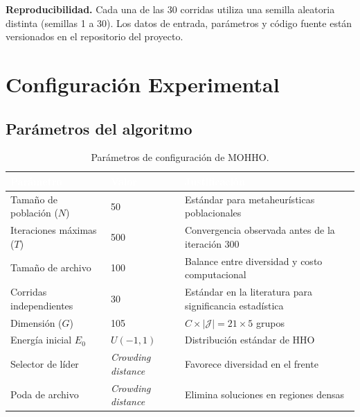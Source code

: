 \documentclass[12pt,letterpaper]{article}
\begin{document}
\begin{yellowbox}
\textbf{Reproducibilidad.} Cada una de las 30 corridas utiliza una semilla aleatoria distinta (semillas 1 a 30). Los datos de entrada, parámetros y código fuente están versionados en el repositorio del proyecto.
\end{yellowbox}

\newpage
\section{Configuración Experimental}
\label{sec:config}

\subsection{Parámetros del algoritmo}

\begin{table}[H]
\centering
\caption{Parámetros de configuración de MOHHO.}
\label{tab:parametros_mohho}
\renewcommand{\arraystretch}{1.4}
\begin{tabular}{lll}
\toprule
\rowcolor{tablehead}
\textcolor{white}{\textbf{Parámetro}} & \textcolor{white}{\textbf{Valor}} & \textcolor{white}{\textbf{Justificación}} \\
\midrule
Tamaño de población ($N$) & 50 & Estándar para metaheurísticas poblacionales \\
\rowcolor{gray!8}
Iteraciones máximas ($T$) & 500 & Convergencia observada antes de la iteración 300 \\
Tamaño de archivo & 100 & Balance entre diversidad y costo computacional \\
\rowcolor{gray!8}
Corridas independientes & 30 & Estándar en la literatura para significancia estadística \\
Dimensión ($G$) & 105 & $C \times |\mathcal{J}| = 21 \times 5$ grupos \\
\rowcolor{gray!8}
Energía inicial $E_0$ & $U(-1, 1)$ & Distribución estándar de HHO \parencite{heidari2019} \\
Selector de líder & \textit{Crowding distance} & Favorece diversidad en el frente \\
\rowcolor{gray!8}
Poda de archivo & \textit{Crowding distance} & Elimina soluciones en regiones densas \\
\bottomrule
\end{tabular}
\end{table}
\end{document}
